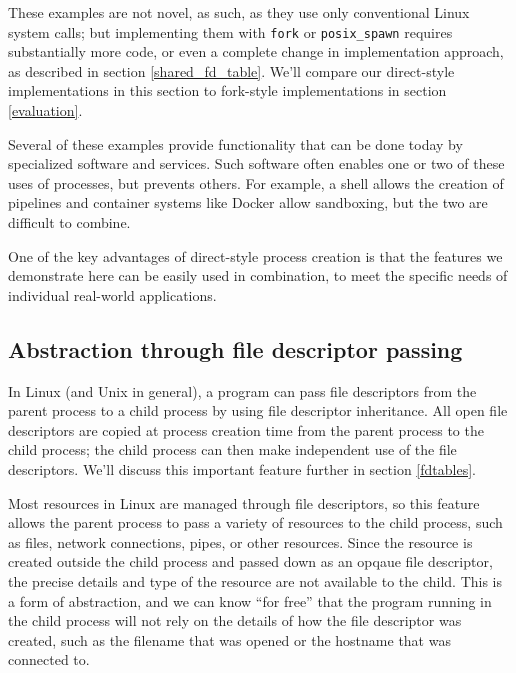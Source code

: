 \documentclass[letterpaper,twocolumn,10pt]{article}
\begin{document}
These examples are not novel, as such, as they use only conventional Linux system calls;
but implementing them with \texttt{fork} or \verb|posix_spawn| requires substantially more code,
or even a complete change in implementation approach,
as described in section \ref{shared_fd_table}.
We'll compare our direct-style implementations in this section
to fork-style implementations
in section \ref{evaluation}.

Several of these examples provide functionality that can be done today by specialized software and services.
Such software often enables one or two of these uses of processes, but prevents others.
For example, a shell allows the creation of pipelines and container systems like Docker allow sandboxing,
but the two are difficult to combine.\cite{docker_pipe}

One of the key advantages of direct-style process creation is that the features we demonstrate here
can be easily used in combination,
to meet the specific needs of individual real-world applications.
\subsection{Abstraction through file descriptor passing}\label{fd_abstraction}
In Linux (and Unix in general),
a program can pass file descriptors from the parent process to a child process
by using file descriptor inheritance.
All open file descriptors are copied at process creation time from the parent process to the child process;
the child process can then make independent use of the file descriptors.
We'll discuss this important feature further in section \ref{fdtables}.

Most resources in Linux are managed through file descriptors,
so this feature allows the parent process to pass a variety of resources to the child process,
such as files, network connections, pipes, or other resources.\cite{ucspi}
Since the resource is created outside the child process and passed down as an opqaue file descriptor,
the precise details and type of the resource are not available to the child.
This is a form of abstraction,
and we can know ``for free''\cite{theoremsforfree}
that the program running in the child process
will not rely on the details of how the file descriptor was created,
such as the filename that was opened or the hostname that was connected to.
\end{document}
